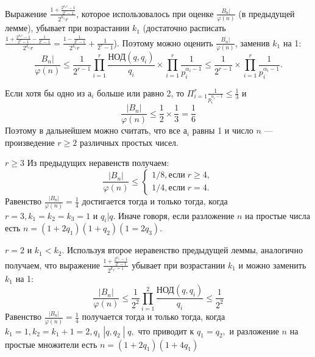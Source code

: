 \documentclass{mai_book}
\begin{document}
	\noindent
	
	Выражение $\frac{1+\frac{2^{k_1r}-1}{2^r-1}}{2^{k_1}r}$, которое использовалось при оценке $\frac{B_n|}{\varphi(n)}$ (в предыдущей лемме), убывает при возрастании $k_1$ (достаточно расписать
	$\frac{1+\frac{2^{k_1r}-1}{2^r-1}-\frac{1}{2^r-1}}{2^{k_1}r} = \frac{1-\frac{1}{2^r-1}}{2^{k_1}r} + \frac{1}{2^r-1}$). Поэтому можно оценить $\frac{B_n|}{\varphi(n)}$, заменив $k_1$ на 1:
	\begin{equation}
	\frac{B_n|}{\varphi(n)} \leqslant \frac{1}{2^{r-1}}\prod^{r}_{i=1} \frac{\text{НОД}(q,q_i)}{q_i} \times \prod^{r}_{i=1} \frac{1}{p_{i}^{\alpha_i-1}} \leqslant \frac{1}{2^{r-1}} \times \prod^{r}_{i=1} \frac{1}{p_{i}^{\alpha_i-1}}.
	\end{equation} 
	

	\pagebreak
	\noindent
	Если хотя бы одно из $а_i$ больше или равно 2, то $\Pi^{r}_{i=1}\frac{1}{p_{i}^{\alpha_i-1}} \leqslant \frac{1}{3}$ и 
	\begin{equation}
	\frac{|B_n|}{\varphi(n)}\leqslant \frac{1}{2} \times \frac{1}{3} = \frac{1}{6}
	\end{equation}	
	Поэтому в дальнейшем можно считать, что все $а_i$ равны 1 и число $n$ —
	произведение $r \geqslant 2$ различных простых чисел.
	\begin{beznomera}[Случай]
	$r \geqslant 3$ Из предыдущих неравенств получаем: 
	\begin{equation}
	\frac{|B_n|}{\varphi(n)} \leqslant 
	\begin{cases}
	1/8, \text{если}\;r\geqslant 4, \\ 
	1/4, \text{если}\;r = 4.
	\end{cases}
	\end{equation}	
	Равенство $\frac{|B_n|}{\varphi(n)} = \frac{1}{4}$ достигается тогда и только тогда, когда $r = 3, k_1=k_2=k_3=1$ и $q_i|q$. Иначе говоря, если разложение $n$ на простые числа есть $n=(1+2q_1)(1+q_2)(1=2q_3)$.
	
	\end{beznomera}

	\begin{beznomera}[Случай]
			$r = 2$ и $k_1<k_2.$ Используя второе неравенство предыдущей леммы, аналогично получаем, что выражение $\frac{1+ \frac{2^{k_{1^r}}-1}{2^r-1}}{2^{k_{1^r}=1}}$ убывает	при возрастании $k_1$ и можно заменить $k_1$ на 1:
			\begin{equation}
			\frac{|B_n|}{\varphi(n)} \leqslant \frac{1}{2^2}\prod^{2}_{i=1} \frac{\text{НОД}(q,q_i)}{q_i} \leqslant \frac{1}{2^2}
			\end{equation}
	Равенство 	$\frac{|B_n|}{\varphi(n)} = \frac{1}{4}$ получается тогда и только тогда, когда $k_1=1, k_2=k_1 +1 = 2,q_1\;|q,q_2\;|\;q,$ что приводит к $q_1=q_2,$ и разложение $n$ на	простые множители есть $n=(1+2q_1)(1+4q_1)$
	\end{beznomera}	
\end{document}

